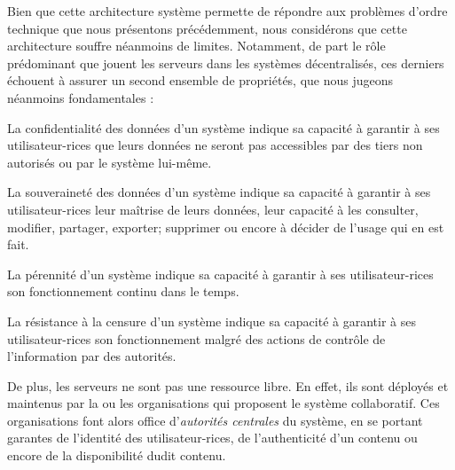 Bien que cette architecture système permette de répondre aux problèmes d'ordre technique que nous présentons précédemment, nous considérons que cette architecture souffre néanmoins de limites.
Notamment, de part le rôle prédominant que jouent les serveurs dans les systèmes décentralisés, ces derniers échouent à assurer un second ensemble de propriétés, que nous jugeons néanmoins fondamentales :
\begin{definition}
  \label{def:confidentialite}
  La confidentialité des données d'un système indique sa capacité à garantir à ses utilisateur-rices que leurs données ne seront pas accessibles par des tiers non autorisés ou par le système lui-même.
\end{definition}
\begin{definition}
  \label{def:souverainete}
  La souveraineté des données d'un système indique sa capacité à garantir à ses utilisateur-rices leur maîtrise de leurs données, \ie leur capacité à les consulter, modifier, partager, exporter; supprimer ou encore à décider de l'usage qui en est fait.
\end{definition}
\begin{definition}[Pérennité]
  \label{def:perennite}
  La pérennité d'un système indique sa capacité à garantir à ses utilisateur-rices son fonctionnement continu dans le temps.
\end{definition}
\begin{definition}
  \label{def:censorship}
  La résistance à la censure d'un système indique sa capacité à garantir à ses utilisateur-rices son fonctionnement malgré des actions de contrôle de l'information par des autorités.
\end{definition}

De plus, les serveurs ne sont pas une ressource libre.
En effet, ils sont déployés et maintenus par la ou les organisations qui proposent le système collaboratif.
Ces organisations font alors office d'\emph{autorités centrales} du système, \eg en se portant garantes de l'identité des utilisateur-rices, de l'authenticité d'un contenu ou encore de la disponibilité dudit contenu.

